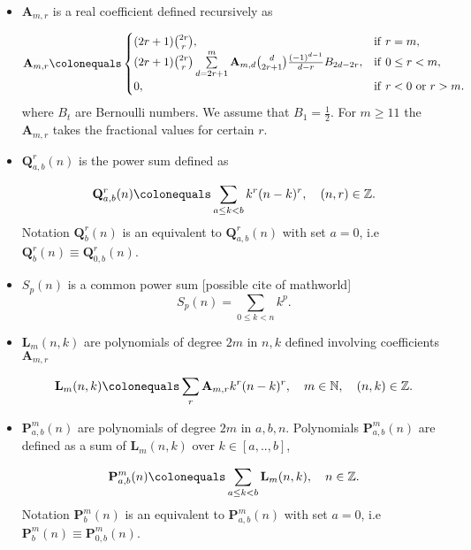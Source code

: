\documentclass[12pt, letterpaper]{amsart}
\theoremstyle{definition}
\theoremstyle{remark}
\newenvironment{myitemize}
{ \begin{itemize}
    \setlength{\itemsep}{4pt}
    \setlength{\parskip}{4pt}
    \setlength{\parsep}{4pt}     }
{ \end{itemize}                  }
\numberwithin{equation}{section}
\begin{document}
\begin{myitemize}
\item $\mathbf{A}_{m,r}$ is a real coefficient defined recursively as

\begin{equation*}
\mathbf{A}_{m,r}\colonequals
\begin{cases}
(2r+1)\binom{2r}{r}, & \mathrm{if } \ r=m, \\
(2r+1)\binom{2r}{r} \sum\limits_{d=2r+1}^{m} \mathbf{A}_{m,d} \binom{d}{2r+1} \frac{(-1)^{d-1}}{d-r} B_{2d-2r}, & \mathrm{if } \ 0 \leq r < m, \\
0, & \mathrm{if } \ r<0 \ \mathrm{or } \ r>m.
\end{cases}
\end{equation*}
where $B_t$ are Bernoulli numbers. We assume that $B_1=\tfrac12$. For $m\geq 11$ the $\mathbf{A}_{m,r}$ takes the fractional values for certain $r$.

\item $\mathbf{Q}^{r}_{a,b}(n)$ is the power sum defined as

\begin{equation*}
\mathbf{Q}^{r}_{a,b}(n)\colonequals\sum\limits_{a\leq k<b} k^r(n-k)^r, \quad (n,r)\in\mathbb{Z}.
\end{equation*}
Notation $\mathbf{Q}^{r}_{b}(n)$ is an equivalent to $\mathbf{Q}^{r}_{a,b}(n)$ with set $a=0$, i.e $\mathbf{Q}^{r}_{b}(n) \equiv \mathbf{Q}^{r}_{0,b}(n)$.

\item $S_p(n)$ is a common power sum [possible cite of mathworld]
\begin{equation*}
S_p(n) = \sum_{0\leq k < n} k^p.
\end{equation*}

\item $\mathbf{L}_m(n,k)$ are polynomials of degree $2m$ in $n,k$ defined involving coefficients $\mathbf{A}_{m,r}$

\begin{equation*}
\mathbf{L}_m(n,k)\colonequals\sum\limits_{r} \mathbf{A}_{m,r} k^r(n-k)^r, \quad m\in\mathbb{N}, \quad (n,k)\in\mathbb{Z}.
\end{equation*}

\item $\mathbf{P}^{m}_{a,b}(n)$ are polynomials of degree $2m$ in $a, b, n$. Polynomials $\mathbf{P}^{m}_{a,b}(n)$ are defined as a sum of $\mathbf{L}_m(n,k)$ over $k\in [a,..,b]$,

\begin{equation*}
\mathbf{P}^{m}_{a,b}(n)\colonequals \sum\limits_{a\leq k<b} \mathbf{L}_{m}(n,k), \quad n\in\mathbb{Z}.
\end{equation*}
Notation $\mathbf{P}^{m}_{b}(n)$ is an equivalent to $\mathbf{P}^{m}_{a,b}(n)$ with set $a=0$, i.e $\mathbf{P}^{m}_{b}(n) \equiv \mathbf{P}^{m}_{0,b}(n)$.


\end{myitemize}
\end{document}
